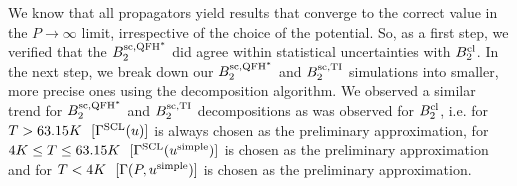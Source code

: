     We know that all propagators yield results that converge to the correct value in the $P \to \infty$ limit, irrespective of the choice of the potential. So, as a first step, we verified that the $B_2^{\rm sc,QFH^*}$ did agree within statistical uncertainties with $B_2^{\rm cl}$. In the next step, we break down our $B_2^{\rm sc,QFH^*}$ and $B_2^{\rm sc,TI}$ simulations into smaller, more precise ones using the decomposition algorithm. We observed a similar trend for $B_2^{\rm sc,QFH^*}$ and $B_2^{\rm sc,TI}$ decompositions as was observed  \cite{Shaul2012} for $B_2^{\rm cl}$, i.e. for $T > 63.15 K ~~ [\Gamma^{\rm SCL}(u)]$ is always chosen as the preliminary approximation, for $4 K \le T \le 63.15 K ~~ [\Gamma^{\rm SCL}(u^{\rm simple})]$ is chosen as the preliminary approximation and for $T < 4 K ~~ [\Gamma(P,u^{\rm simple})]$ is chosen as the preliminary approximation.

